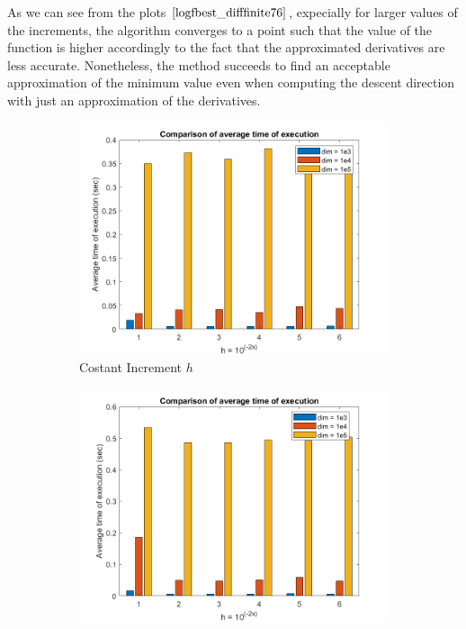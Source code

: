 As we can see from the plots $\eqref{logfbest_difffinite76}$, expecially for larger values of the increments, the algorithm converges to a point such that the value of the function is higher accordingly to the fact that the approximated derivatives are less accurate. Nonetheless, the method succeeds to find an acceptable approximation of the minimum value even when computing the descent direction with just an approximation of the derivatives.

\begin{figure}[htbp]
    \centering
    \begin{subfigure}[t]{0.45\textwidth}  %
        \centering
        \includegraphics[width=\textwidth]{img/pb76_MN_difffinite_COST_timeofexec.png}
        \caption{Costant Increment $h$}
    \end{subfigure}
    \hspace{1cm} %
    \begin{subfigure}[t]{0.45\textwidth}
        \centering
        \includegraphics[width=\textwidth]{img/pb76_MN_difffinite_REL_timeofexec.png}

\end{subfigure}
\end{figure}
